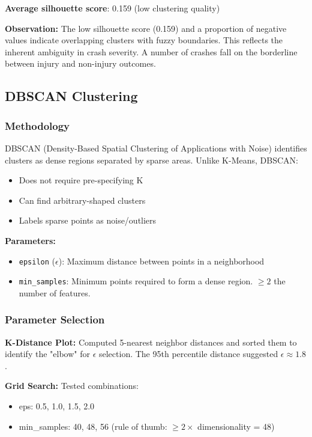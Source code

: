\documentclass[stu,12pt,floatsintext]{apa7}
\begin{document}
\textbf{Average silhouette score}: 0.159 (low clustering quality)

\textbf{Observation:} The low silhouette score (0.159) and a proportion of negative values indicate overlapping clusters with fuzzy boundaries. 
This reflects the inherent ambiguity in crash severity. A number of crashes fall on the borderline between injury and non-injury outcomes.

\subsection{DBSCAN Clustering}

\subsubsection{Methodology}

DBSCAN (Density-Based Spatial Clustering of Applications with Noise) identifies clusters as dense regions separated by sparse areas. Unlike K-Means, DBSCAN:
\begin{itemize}
    \item Does not require pre-specifying K
    \item Can find arbitrary-shaped clusters
    \item Labels sparse points as noise/outliers
\end{itemize}

\textbf{Parameters:}
\begin{itemize}
    \item \texttt{epsilon} ($\epsilon$): Maximum distance between points in a neighborhood
    \item \texttt{min\_samples}: Minimum points required to form a dense region. $\geq 2$ the number of features. 
\end{itemize}

\subsubsection{Parameter Selection}

\textbf{K-Distance Plot:} Computed 5-nearest neighbor distances and sorted them to identify the "elbow" for $\epsilon$ selection. The 95th percentile distance suggested $\epsilon \approx 1.8$.

\textbf{Grid Search:} Tested combinations:
\begin{itemize}
    \item eps: 0.5, 1.0, 1.5, 2.0
    \item min\_samples: 40, 48, 56 (rule of thumb: $\geq 2 \times$ dimensionality = 48)
\end{itemize}
\end{document}
